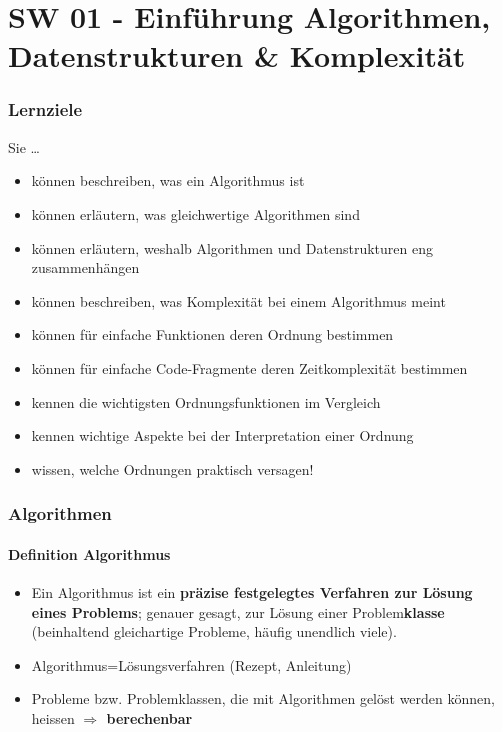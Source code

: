 \part{SW 01 - Einführung Algorithmen, Datenstrukturen \& Komplexität}
\section{Lernziele}
Sie \dots
\begin{itemize}[noitemsep,topsep=0pt,leftmargin=*]
    \item können beschreiben, was ein Algorithmus ist
    \item können erläutern, was gleichwertige Algorithmen sind
    \item können erläutern, weshalb Algorithmen und Datenstrukturen eng zusammenhängen
    \item können beschreiben, was Komplexität bei einem Algorithmus meint
    \item können für einfache Funktionen deren Ordnung bestimmen
    \item können für einfache Code-Fragmente deren Zeitkomplexität bestimmen
    \item kennen die wichtigsten Ordnungsfunktionen im Vergleich
    \item kennen wichtige Aspekte bei der Interpretation einer Ordnung
    \item wissen, welche Ordnungen praktisch versagen!
\end{itemize}

\section{Algorithmen}
\subsection{Definition Algorithmus}
\begin{itemize}[noitemsep,topsep=0pt,leftmargin=*]
    \item Ein Algorithmus ist ein \textbf{präzise festgelegtes Verfahren zur Lösung eines Problems}; genauer gesagt, zur Lösung einer Problem\textbf{klasse} (beinhaltend gleichartige Probleme, häufig unendlich viele).
    \item Algorithmus=Lösungsverfahren (Rezept, Anleitung)
    \item Probleme bzw. Problemklassen, die mit Algorithmen gelöst werden können, heissen \textbf{$\Rightarrow$ berechenbar}
\end{itemize}

